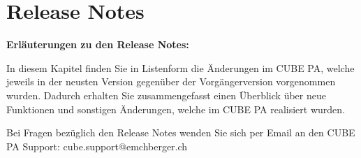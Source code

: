 
\clearpage
\section{Release Notes}

\textbf{Erläuterungen zu den Release Notes:}

\vspace{\baselineskip}

In diesem Kapitel finden Sie in Listenform die Änderungen im CUBE PA, welche jeweils in der neusten Version gegenüber der Vorgängerversion vorgenommen wurden. Dadurch erhalten Sie zusammengefasst einen Überblick über neue Funktionen und sonstigen Änderungen, welche im CUBE PA realisiert wurden.

\vspace{\baselineskip}

Bei Fragen bezüglich den Release Notes wenden Sie sich per Email an den CUBE PA Support: {\color{red} cube.support@emchberger.ch}

